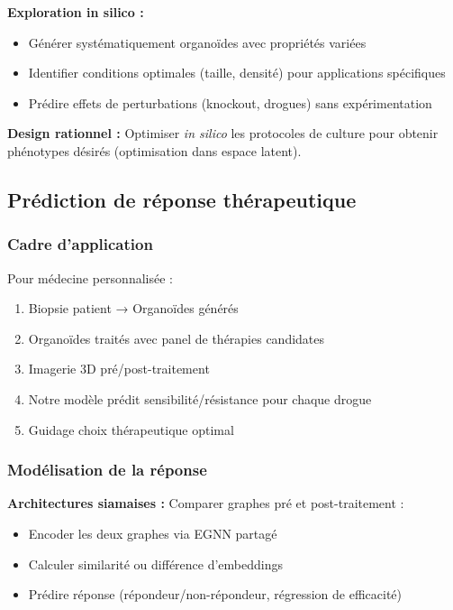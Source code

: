 \textbf{Exploration in silico :}
\begin{itemize}
    \item Générer systématiquement organoïdes avec propriétés variées
    \item Identifier conditions optimales (taille, densité) pour applications spécifiques
    \item Prédire effets de perturbations (knockout, drogues) sans expérimentation
\end{itemize}

\textbf{Design rationnel :}
Optimiser \textit{in silico} les protocoles de culture pour obtenir phénotypes désirés (optimisation dans espace latent).

\subsection{Prédiction de réponse thérapeutique}

\subsubsection{Cadre d'application}

Pour médecine personnalisée :
\begin{enumerate}
    \item Biopsie patient → Organoïdes générés
    \item Organoïdes traités avec panel de thérapies candidates
    \item Imagerie 3D pré/post-traitement
    \item Notre modèle prédit sensibilité/résistance pour chaque drogue
    \item Guidage choix thérapeutique optimal
\end{enumerate}

\subsubsection{Modélisation de la réponse}

\textbf{Architectures siamaises :}
Comparer graphes pré et post-traitement :
\begin{itemize}
    \item Encoder les deux graphes via EGNN partagé
    \item Calculer similarité ou différence d'embeddings
    \item Prédire réponse (répondeur/non-répondeur, régression de efficacité)
\end{itemize}

